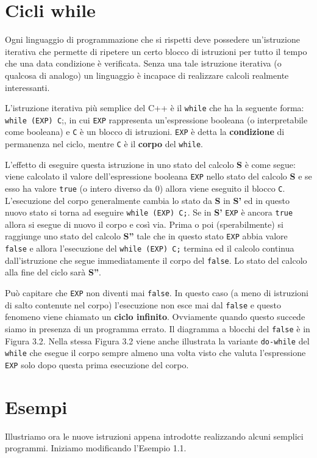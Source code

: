 \documentclass[a4paper,12pt]{book}
\begin{document}
\section{Cicli while}
Ogni linguaggio di programmazione che si rispetti deve possedere un'istruzione iterativa che permette di ripetere un certo blocco di istruzioni per tutto il tempo che una data condizione è verificata. Senza una tale istruzione iterativa (o qualcosa di analogo) un linguaggio è incapace di realizzare calcoli realmente interessanti.

L'istruzione iterativa più semplice del C++ è il \texttt{while} che ha la seguente forma: \texttt{while (EXP) C};, in cui \texttt{EXP} rappresenta un'espressione booleana (o interpretabile come booleana) e \texttt{C} è un blocco di istruzioni. \texttt{EXP} è detta la \textbf{condizione} di permanenza nel ciclo, mentre \texttt{C} è il \textbf{corpo} del \texttt{while}.

L'effetto di eseguire questa istruzione in uno stato del calcolo \textbf{S} è come segue: viene calcolato il valore dell'espressione booleana \texttt{EXP} nello stato del calcolo \textbf{S} e se esso ha valore \texttt{true} (o intero diverso da 0) allora viene eseguito il blocco \texttt{C}. L'esecuzione del corpo generalmente cambia lo stato da \textbf{S} in \textbf{S'} ed in questo nuovo stato si torna ad eseguire \texttt{while (EXP) C;}. Se in \textbf{S'} \texttt{EXP} è ancora \texttt{true} allora si esegue di nuovo il corpo e così via. Prima o poi (sperabilmente) si raggiunge uno stato del calcolo \textbf{S''} tale che in questo stato \texttt{EXP} abbia valore \texttt{false} e allora l'esecuzione del \texttt{while (EXP) C;} termina ed il calcolo continua dall'istruzione che segue immediatamente il corpo del \texttt{false}. Lo stato del calcolo alla fine del ciclo sarà \textbf{S''}.

Può capitare che \texttt{EXP} non diventi mai \texttt{false}. In questo caso (a meno di istruzioni di salto contenute nel corpo) l'esecuzione non esce mai dal \texttt{false} e questo fenomeno viene chiamato un \textbf{ciclo infinito}. Ovviamente quando questo succede siamo in presenza di un programma errato. Il diagramma a blocchi del \texttt{false} è in Figura 3.2. Nella stessa Figura 3.2 viene anche illustrata la variante \texttt{do-while} del \texttt{while} che esegue il corpo sempre almeno una volta visto che valuta l'espressione \texttt{EXP} solo dopo questa prima esecuzione del corpo. 

\section{Esempi}
Illustriamo ora le nuove istruzioni appena introdotte realizzando alcuni semplici programmi. Iniziamo modificando l'Esempio 1.1.
\end{document}
